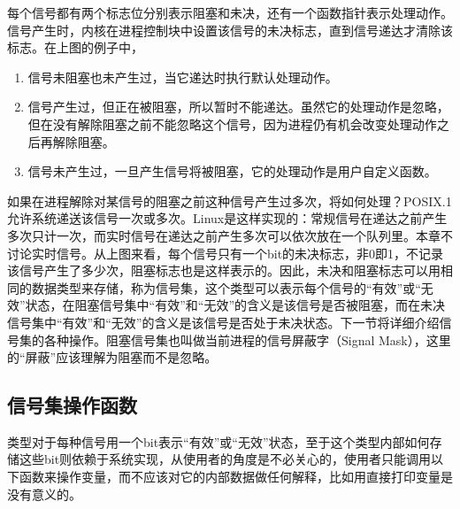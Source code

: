 

每个信号都有两个标志位分别表示阻塞和未决，还有一个函数指针表示处理动作。信号产生时，内核在进程控制块中设置该信号的未决标志，直到信号递达才清除该标志。在上图的例子中，


\begin{enumerate}

\item {}信号未阻塞也未产生过，当它递达时执行默认处理动作。

\item {}信号产生过，但正在被阻塞，所以暂时不能递达。虽然它的处理动作是忽略，但在没有解除阻塞之前不能忽略这个信号，因为进程仍有机会改变处理动作之后再解除阻塞。

\item {}信号未产生过，一旦产生信号将被阻塞，它的处理动作是用户自定义函数。
\end{enumerate}


如果在进程解除对某信号的阻塞之前这种信号产生过多次，将如何处理？POSIX.\BookSplit{}1允许系统递送该信号一次或多次。Linux是这样实现的：常规信号在递达之前产生多次只计一次，而实时信号在递达之前产生多次可以依次放在一个队列里。本章不讨论实时信号。从上图来看，每个信号只有一个bit的未决标志，非0即1，不记录该信号产生了多少次，阻塞标志也是这样表示的。因此，未决和阻塞标志可以用相同的数据类型来存储，称为信号集，这个类型可以表示每个信号的“有效”或“无效”状态，在阻塞信号集中“有效”和“无效”的含义是该信号是否被阻塞，而在未决信号集中“有效”和“无效”的含义是该信号是否处于未决状态。下一节将详细介绍信号集的各种操作。阻塞信号集也叫做当前进程的信号屏蔽字（Signal Mask），这里的“屏蔽”应该理解为阻塞而不是忽略。


\subsection{信号集操作函数}
%


类型对于每种信号用一个bit表示“有效”或“无效”状态，至于这个类型内部如何存储这些bit则依赖于系统实现，从使用者的角度是不必关心的，使用者只能调用以下函数来操作变量，而不应该对它的内部数据做任何解释，比如用直接打印变量是没有意义的。


